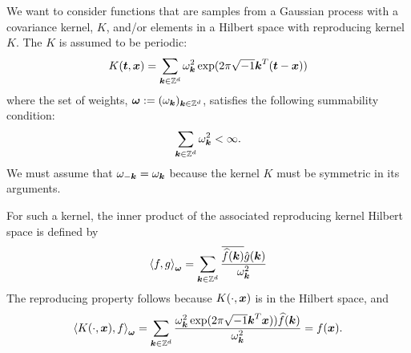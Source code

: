 \documentclass{amsart}
\begin{document}
We want to consider functions that are samples from a Gaussian process with a covariance kernel, $K$, and/or elements in a Hilbert space with reproducing kernel $K$.  The $K$ is assumed to be  periodic:
\begin{equation*}
    K(\vt,\vx) = \sum_{\vk \in \integers^d} \omega_{\vk}^2 \exp(2 \pi \sqrt{-1} \vk^T (\vt - \vx))
\end{equation*}
where the set of weights, $\vomega : = (\omega_{\vk})_{\vk \in \integers^d}$, satisfies the following summability condition:
\begin{equation*}
    \sum_{\vk \in \integers^d} \omega_{\vk}^2 < \infty.
\end{equation*}
We must assume that $\omega_{-\vk} = \omega_{\vk}$  because the kernel $K$ must be symmetric in its arguments. 

For such a kernel, the inner product of the associated reproducing kernel Hilbert space is defined by 
\begin{equation*}
    \ip[\vomega]{f}{g} = \sum_{\vk \in \integers^d} 
    \frac{\overline{\hf(\vk)} \hg(\vk)}{\omega_{\vk}^2}
\end{equation*}
The reproducing property follows because $K(\cdot,\vx)$ is in the Hilbert space, and 
\begin{equation*}
    \ip[\vomega]{K(\cdot,\vx)}{f} 
    = \sum_{\vk \in \integers^d} 
    \frac{ \omega_{\vk}^2 \exp(2 \pi \sqrt{-1} \vk^T \vx)) \hf(\vk)}{\omega_{\vk}^2} = f(\vx).
\end{equation*}
\end{document}
